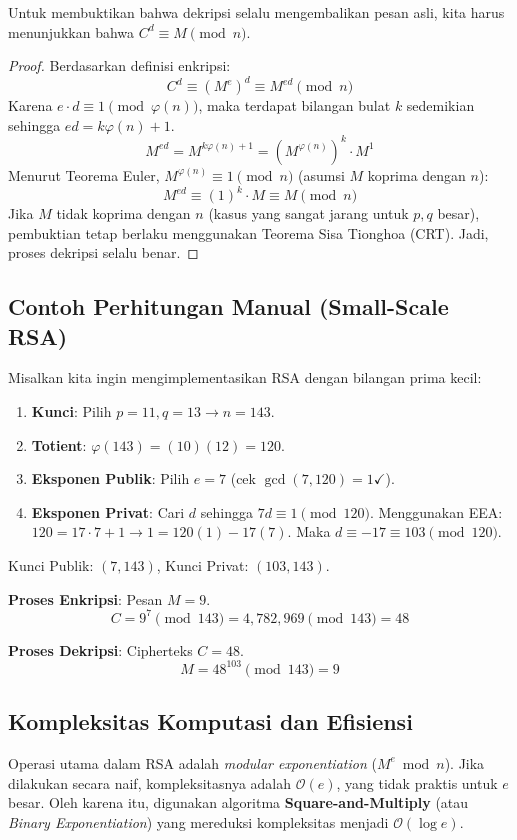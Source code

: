Untuk membuktikan bahwa dekripsi selalu mengembalikan pesan asli, kita harus menunjukkan bahwa $C^d \equiv M \pmod{n}$.

\begin{proof}
Berdasarkan definisi enkripsi:
\[ C^d \equiv (M^e)^d \equiv M^{ed} \pmod{n} \]
Karena $e \cdot d \equiv 1 \pmod{\varphi(n)}$, maka terdapat bilangan bulat $k$ sedemikian sehingga $ed = k\varphi(n) + 1$.
\[ M^{ed} = M^{k\varphi(n) + 1} = (M^{\varphi(n)})^k \cdot M^1 \]
Menurut Teorema Euler, $M^{\varphi(n)} \equiv 1 \pmod{n}$ (asumsi $M$ koprima dengan $n$):
\[ M^{ed} \equiv (1)^k \cdot M \equiv M \pmod{n} \]
Jika $M$ tidak koprima dengan $n$ (kasus yang sangat jarang untuk $p, q$ besar), pembuktian tetap berlaku menggunakan Teorema Sisa Tionghoa (CRT). Jadi, proses dekripsi selalu benar.
\end{proof}

\subsection{Contoh Perhitungan Manual (Small-Scale RSA)}

Misalkan kita ingin mengimplementasikan RSA dengan bilangan prima kecil:
\begin{enumerate}
    \item \textbf{Kunci}: Pilih $p = 11, q = 13 \rightarrow n = 143$.
    \item \textbf{Totient}: $\varphi(143) = (10)(12) = 120$.
    \item \textbf{Eksponen Publik}: Pilih $e = 7$ (cek $\gcd(7, 120) = 1 \checkmark$).
    \item \textbf{Eksponen Privat}: Cari $d$ sehingga $7d \equiv 1 \pmod{120}$.
    Menggunakan EEA: $120 = 17 \cdot 7 + 1 \rightarrow 1 = 120(1) - 17(7)$.
    Maka $d \equiv -17 \equiv 103 \pmod{120}$.
\end{enumerate}
Kunci Publik: $(7, 143)$, Kunci Privat: $(103, 143)$.

\textbf{Proses Enkripsi}: Pesan $M = 9$.
\[ C = 9^7 \pmod{143} = 4,782,969 \pmod{143} = 48 \]

\textbf{Proses Dekripsi}: Cipherteks $C = 48$.
\[ M = 48^{103} \pmod{143} = 9 \]

\subsection{Kompleksitas Komputasi dan Efisiensi}

Operasi utama dalam RSA adalah \textit{modular exponentiation} ($M^e \bmod n$). Jika dilakukan secara naif, kompleksitasnya adalah $\mathcal{O}(e)$, yang tidak praktis untuk $e$ besar. Oleh karena itu, digunakan algoritma \textbf{Square-and-Multiply} (atau \textit{Binary Exponentiation}) yang mereduksi kompleksitas menjadi $\mathcal{O}(\log e)$.

